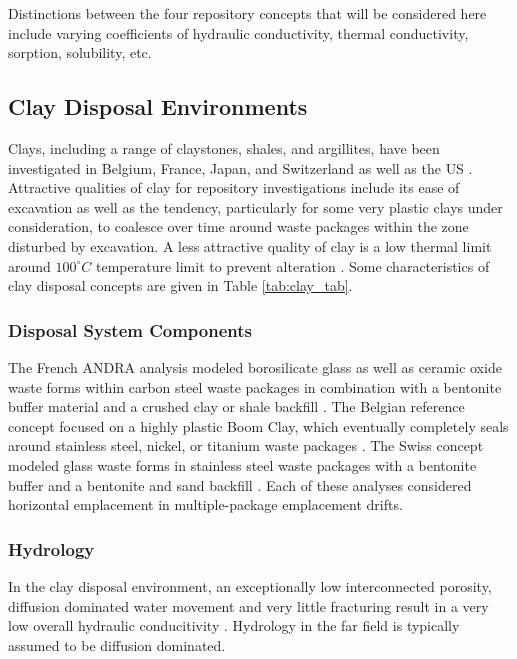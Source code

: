 Distinctions between the four repository concepts that will be considered here 
include varying coefficients of hydraulic conductivity, thermal conductivity, 
sorption, solubility, etc.

\subsection{Clay Disposal Environments}

Clays, including a range of claystones, shales, and argillites, have been 
investigated in Belgium, France, Japan, and Switzerland 
\cite{von_lensa_red-impact_2008} as well as the  \gls{US} 
\cite{clayton_generic_2011}. Attractive qualities 
of clay for repository investigations include its ease of excavation as well as
the tendency, particularly for some very plastic clays under consideration, to 
coalesce over time around waste packages within the zone disturbed by 
excavation.  A less attractive quality of clay is a 
low thermal limit around $100^{\circ}C$ temperature limit to prevent alteration 
\cite{hardin_generic_2011}.
Some characteristics of clay disposal 
concepts are given in Table \ref{tab:clay_tab}.   



\subsubsection{Disposal System Components}

The French \gls{ANDRA}  analysis modeled borosilicate glass as well as ceramic 
oxide waste forms within carbon steel waste packages in combination with a bentonite 
buffer material and a crushed clay or shale backfill \cite{andra_argile:_2005}.
The Belgian reference concept focused on a highly plastic Boom Clay, which 
eventually completely seals around stainless steel, nickel, or titanium waste 
packages \cite{ondraf-niras_technical_2001}.  The Swiss concept modeled glass 
waste forms in stainless steel waste packages with a bentonite buffer and a 
bentonite and sand backfill
\cite{johnson_calculations_2002}. Each of these analyses considered 
horizontal emplacement in multiple-package emplacement drifts. 


\subsubsection{Hydrology}

In the clay disposal environment, an exceptionally low interconnected porosity,
diffusion dominated water movement and very little fracturing result in a very low 
overall hydraulic conducitivity . Hydrology in the far field is 
typically assumed to be diffusion dominated.

